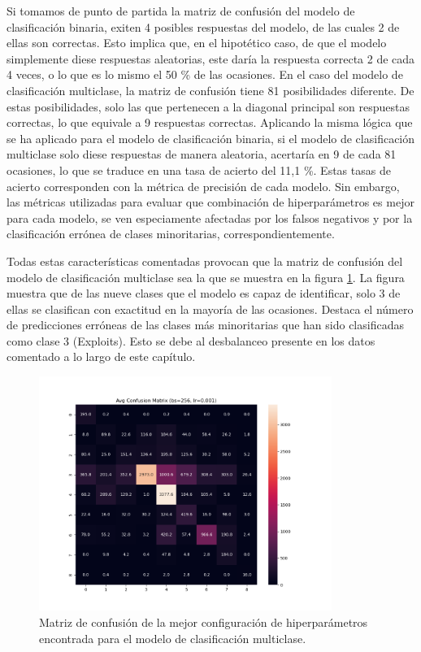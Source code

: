 \begin{enumerate}
	Si tomamos de punto de partida la matriz de confusión del modelo de clasificación binaria, exiten 4 posibles respuestas del modelo, de las cuales 2 de ellas son correctas. Esto implica que, en el hipotético caso, de que el modelo simplemente diese respuestas aleatorias, este daría la respuesta correcta 2 de cada 4 veces, o lo que es lo mismo el 50 \% de las ocasiones. En el caso del modelo de clasificación multiclase, la matriz de confusión tiene 81 posibilidades diferente. De estas posibilidades, solo las que pertenecen a la diagonal principal son respuestas correctas, lo que equivale a 9 respuestas correctas. Aplicando la misma lógica que se ha aplicado para el modelo de clasificación binaria, si el modelo de clasificación multiclase solo diese respuestas de manera aleatoria, acertaría en 9 de cada 81 ocasiones, lo que se traduce en una tasa de acierto del 11,1 \%. Estas tasas de acierto corresponden con la métrica de precisión de cada modelo. Sin embargo, las métricas utilizadas para evaluar que combinación de hiperparámetros es mejor para cada modelo, se ven especiamente afectadas por los falsos negativos y por la clasificación errónea de clases minoritarias, correspondientemente.
\end{enumerate}

Todas estas características comentadas provocan que la matriz de confusión del modelo de clasificación multiclase sea la que se muestra en la figura \ref{fig:MCMUL}. La figura muestra que de las nueve clases que el modelo es capaz de identificar, solo 3 de ellas se clasifican con exactitud en la mayoría de las ocasiones. Destaca el número de predicciones erróneas de las clases más minoritarias que han sido clasificadas como clase 3 (Exploits). Esto se debe al desbalanceo presente en los datos comentado a lo largo de este capítulo.


\begin{figure}[H]
    \centering
    \includegraphics[width=0.85\textwidth]{./img/modelo/MCMUL.png}
    \caption{Matriz de confusión de la mejor configuración de hiperparámetros encontrada  para el modelo de clasificación multiclase.}
    \label{fig:MCMUL}
\end{figure}

